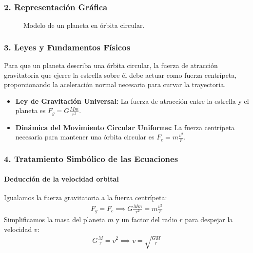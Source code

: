 \subsubsection*{2. Representación Gráfica}
\begin{figure}[H]
    \centering
    \caption{Modelo de un planeta en órbita circular.}
\end{figure}

\subsubsection*{3. Leyes y Fundamentos Físicos}
Para que un planeta describa una órbita circular, la fuerza de atracción gravitatoria que ejerce la estrella sobre él debe actuar como fuerza centrípeta, proporcionando la aceleración normal necesaria para curvar la trayectoria.
\begin{itemize}
    \item \textbf{Ley de Gravitación Universal:} La fuerza de atracción entre la estrella y el planeta es $F_g = G \frac{Mm}{r^2}$.
    \item \textbf{Dinámica del Movimiento Circular Uniforme:} La fuerza centrípeta necesaria para mantener una órbita circular es $F_c = m \frac{v^2}{r}$.
\end{itemize}

\subsubsection*{4. Tratamiento Simbólico de las Ecuaciones}
\paragraph*{Deducción de la velocidad orbital}
Igualamos la fuerza gravitatoria a la fuerza centrípeta:
\begin{gather}
    F_g = F_c \implies G \frac{Mm}{r^2} = m \frac{v^2}{r}
\end{gather}
Simplificamos la masa del planeta $m$ y un factor del radio $r$ para despejar la velocidad $v$:
\begin{gather}
    G \frac{M}{r} = v^2 \implies v = \sqrt{\frac{GM}{r}}
\end{gather}

